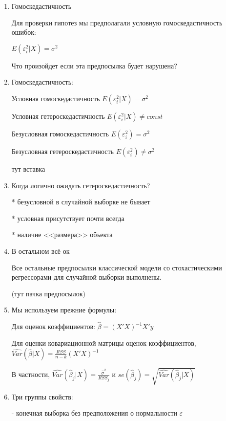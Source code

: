 \documentclass[12pt,a4paper]{article}
\begin{document}
{\Huge

\begin{enumerate}

\item Гомоскедастичность

Для проверки гипотез мы предполагали условную гомоскедастичность ошибок:

$ E(\varepsilon_i^2 | X)=\sigma^2 $

Что произойдет если эта предпосылка будет нарушена?

\item Гомоскедастичность:

Условная гомоскедастичность $E(\varepsilon_i^2 | X)=\sigma^2$

Условная гетероскедастичность  $E(\varepsilon_i^2 | X) \neq const$


Безусловная гомоскедастичность $E(\varepsilon_i^2)=\sigma^2$

Безусловная гетероскедастичность $E(\varepsilon_i^2) \neq \sigma^2$



тут вставка


\item Когда логично ожидать гетероскедастичность?

* безусловной в случайной выборке не бывает

* условная присутствует почти всегда

* наличие <<размера>> объекта

\item В остальном всё ок

Все остальные предпосылки классической модели со стохастическими регрессорами для случайной выборки выполнены.

(тут пачка предпосылок)

\newpage
\item  Мы используем прежние формулы:

Для оценок коэффициентов:
$\hat{\beta}=(X'X)^{-1}X'y$

Для оценки ковариационной матрицы оценок коэффициентов,
$\widehat{Var}(\hat{\beta}|X)=\frac{RSS}{n-k}(X'X)^{-1}$

В частности, $\widehat{Var}(\hat{\beta}_j|X)=\frac{\hat{\sigma}^2}{RSS_j}$
и $se(\hat{\beta}_j)=\sqrt{\widehat{Var}(\hat{\beta}_j|X)}$


\item Три группы свойств:

- конечная выборка без предположения о нормальности $\varepsilon$


\end{enumerate}}
\end{document}
